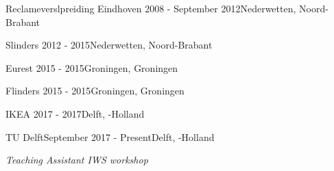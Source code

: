 
    
\begin{rSection}{}

\begin{experienceItem}{Reclameverslpreiding Eindhoven}{ 2008 - September 2012}{}{Nederwetten, Noord-Brabant}
\item \textit{}
\end{experienceItem}


\begin{experienceItem}{Slinders}{ 2012 -  2015}{}{Nederwetten, Noord-Brabant}
\item \textit{}
\end{experienceItem}

\begin{experienceItem}{Eurest}{ 2015 -  2015}{}{Groningen, Groningen}
\item \textit{}
\end{experienceItem}

\begin{experienceItem}{Flinders}{ 2015 -  2015}{}{Groningen, Groningen}
\item \textit{}
\end{experienceItem}

\begin{experienceItem}{IKEA}{ 2017 -  2017}{}{Delft, -Holland}
\item \textit{}
\end{experienceItem}

\begin{experienceItem}{TU Delft}{September 2017 - Present}{}{Delft, -Holland}
\item \textit{Teaching Assistant IWS workshop}
\end{experienceItem}


\end{rSection}
